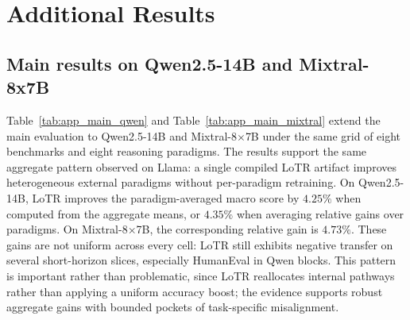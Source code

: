\section{Additional Results}
\label{app:extra_results}

\subsection{Main results on Qwen2.5-14B and Mixtral-8x7B}
\label{app:extra_main}

Table~\ref{tab:app_main_qwen} and Table~\ref{tab:app_main_mixtral} extend the main evaluation to Qwen2.5-14B and Mixtral-8$\times$7B under the same grid of eight benchmarks and eight reasoning paradigms. The results support the same aggregate pattern observed on Llama: a single compiled LoTR artifact improves heterogeneous external paradigms without per-paradigm retraining. On Qwen2.5-14B, LoTR improves the paradigm-averaged macro score by \(4.25\%\) when computed from the aggregate means, or \(4.35\%\) when averaging relative gains over paradigms. On Mixtral-8$\times$7B, the corresponding relative gain is \(4.73\%\). These gains are not uniform across every cell: LoTR still exhibits negative transfer on several short-horizon slices, especially HumanEval in Qwen blocks. This pattern is important rather than problematic, since LoTR reallocates internal pathways rather than applying a uniform accuracy boost; the evidence supports robust aggregate gains with bounded pockets of task-specific misalignment.

